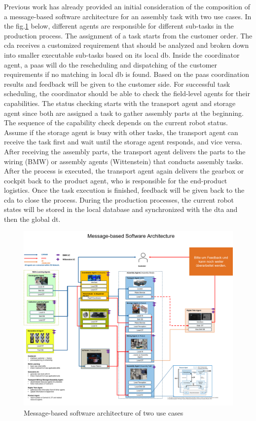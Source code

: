 Previous work has already provided an initial consideration of the composition 
of a message-based software architecture for an assembly task with two use cases. 
In the
fig.\ref{fig: Msg-based-SW-architecture} below, different agents are responsible for different sub-tasks in the 
production process. The assignment of a task starts from the customer order. 
The \gls{cda} receives a customized requirement that should be analyzed 
and broken down 
into smaller executable sub-tasks based on its local \gls{db}. Inside the coordinator 
agent, a \gls{paas} will do the rescheduling and dispatching of the customer 
requirements if no matching in local \gls{db} is found. Based on the \gls{paas} 
coordination results and feedback will be given to the customer side. For successful 
task scheduling, the coordinator should be able to check the field-level 
agents for their capabilities. The status checking starts with the transport agent 
and storage agent since both are assigned a task to gather 
assembly parts at the beginning. The sequence of the capability check 
depends on the current robot status. Assume if the storage agent is busy with 
other tasks, the transport agent can receive the task first and wait until 
the storage agent responds, and vice versa. After receiving the assembly parts, the transport 
agent delivers the parts to the wiring (BMW) or assembly agents (Wittenstein) that 
conducts assembly tasks. After the process is executed, the transport 
agent again delivers the gearbox or cockpit back to the product agent, who is 
responsible for the end-product logistics. Once the task execution is 
finished, feedback will be given back to the \gls{cda} to close 
the process. During the production processes, the current robot states will be 
stored in the local database and synchronized with the \gls{dta} and 
then the global \gls{dt}.


\begin{figure}[htb]
    \includegraphics[width=\textwidth]{figures/Prelimilary/Msg-based-Software-Architecture.png}
    \centering
    \caption{Message-based software architecture of two use cases\label{fig: Msg-based-SW-architecture}}
    \end{figure}


